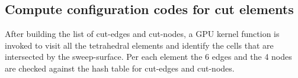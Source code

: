 \subsection{Compute configuration codes for cut elements}
After building the list of cut-edges and cut-nodes, a GPU kernel function is invoked to visit all the tetrahedral elements and identify 
the cells that are intersected by the sweep-surface. Per each element the 6 edges and the 4 nodes are checked against the hash table for 
cut-edges and cut-nodes. 

